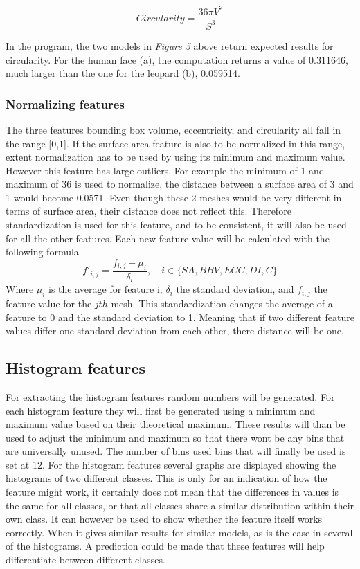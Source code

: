 \documentclass{bigdata}
\begin{document}
\begin{equation}
Circularity = \frac{36\pi V^2}{S^3}
\end{equation}

In the program, the two models in \textit{Figure 5} above return expected results for circularity. For the human face (a), the computation returns a value of 0.311646, much larger than the one for the leopard (b), 0.059514.

\subsubsection{Normalizing  features}
The three features bounding box volume, eccentricity, and circularity all fall in the range [0,1]. If the surface area feature is also to be normalized in this range, extent normalization has to be used by using its minimum and maximum value. However this feature has large outliers. For example the minimum of 1 and maximum of 36 is used to normalize, the distance between a surface area of 3 and 1 would become 0.0571. Even though these 2 meshes would be very different in terms of surface area, their distance does not reflect this. Therefore standardization is used for this feature, and to be consistent, it will also be used for all the other  features. 
Each new feature value will be calculated with the following formula
\begin{equation}
f'_{i,j} = \frac{f_{i,j} - \mu_i}{\delta_i},\quad i \in \{SA,BBV,ECC,DI,C\}
\end{equation}
Where $\mu_i$ is the average for feature i, $\delta_i$ the standard deviation, and $f_{i,j}$ the feature value for the $jth$ mesh. This standardization changes  the average of a feature to 0 and the standard deviation to 1. Meaning that if two different feature values differ one standard deviation from each other, there distance will be one. 

\subsection{Histogram features}
For extracting the histogram features random numbers will be generated. 
For each histogram feature they will first be generated using a minimum and maximum value based on their theoretical maximum. These results will than be used to adjust the minimum and maximum so that there wont be any bins that are universally unused. The number of bins used bins that will finally be used is set at 12.
For the histogram features several graphs are displayed showing the histograms of two different classes. This is only for an indication of how the feature might work, it certainly does not mean that the differences in values is the same for all classes, or that all classes share a similar distribution within their own class. It can however be used to show whether the feature itself works correctly. When it gives similar results for similar models, as is the case in several of the histograms. A prediction could be made that these features will help differentiate between different classes. 
\end{document}
